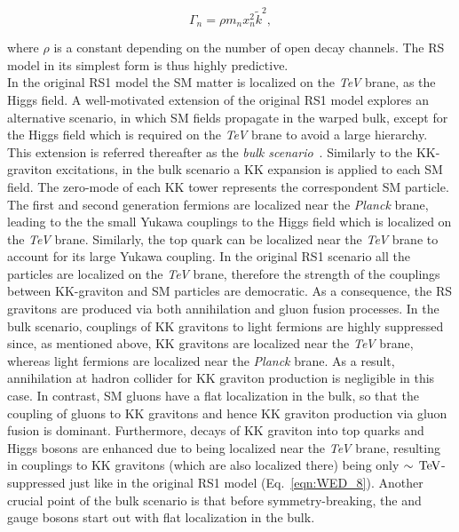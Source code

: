 \begin{equation}\label{eqn:WED_9}
\Gamma_n = \rho m_n x^2_n\tilde{k}^2,
\end{equation}

\noindent where $\rho$ is a constant depending on the number of open decay channels.
The RS model in its simplest form is thus highly predictive.\\

In the original RS1 model the SM matter is localized on the \textit{TeV} brane, as the Higgs field.
A well-motivated extension of the original RS1 model explores an alternative scenario, in which 
SM fields propagate in the warped bulk, except for the Higgs field which is required on the \textit{TeV} brane to avoid a large hierarchy.
This extension is referred thereafter as the \textit{bulk scenario}~\cite{Agashe:2007zd,Fitzpatrick:2007qr}.
Similarly to the KK-graviton excitations, in the bulk scenario a KK expansion is applied to each SM field.
The zero-mode of each KK tower represents the correspondent SM particle.
The first and second generation fermions are localized near the \textit{Planck} brane, leading to the the small Yukawa couplings to the Higgs field which is localized on the \textit{TeV} brane.
Similarly, the top quark can be localized near the \textit{TeV} brane to account for its large Yukawa coupling.
In the original RS1 scenario all the particles are localized on the \textit{TeV} brane, therefore the strength of the couplings between KK-graviton and SM particles are democratic. 
As a consequence, the RS gravitons are produced via both \qqbar annihilation and gluon fusion processes.
In the bulk scenario, couplings of KK gravitons to light fermions are highly suppressed since, as mentioned above, KK gravitons are localized near the \textit{TeV} brane, whereas light fermions are localized near the \textit{Planck} brane. As a result, \qqbar annihilation at hadron collider for KK graviton production is negligible in this case.
In contrast, SM gluons have a flat localization in the bulk, so that the coupling of gluons to KK gravitons and hence KK graviton production via gluon fusion is dominant.
Furthermore, decays of KK graviton into top quarks and Higgs bosons are enhanced due to being localized near the \textit{TeV} brane, resulting in couplings to KK gravitons (which are also localized there) being only $\sim\,\text{Te\hspace{-.08em}V}$-suppressed just like in the original RS1 model (Eq.~\ref{eqn:WED_8}).
Another crucial point of the bulk scenario is that before symmetry-breaking, the \PW and \PZ gauge bosons start out with flat localization in the bulk. %
